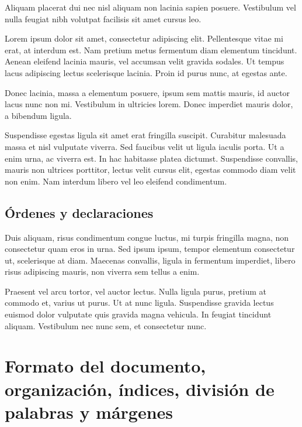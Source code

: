 \documentclass[12pt,a4paper]{report}
\begin{document}
Aliquam placerat dui nec nisl aliquam non lacinia sapien posuere. Vestibulum vel nulla feugiat nibh volutpat facilisis sit amet cursus leo.

Lorem ipsum dolor sit amet, consectetur adipiscing elit. Pellentesque vitae mi erat, at interdum est. Nam pretium metus fermentum diam elementum tincidunt. Aenean eleifend lacinia mauris, vel accumsan velit gravida sodales. Ut tempus lacus adipiscing lectus scelerisque lacinia. Proin id purus nunc, at egestas ante. 

Donec lacinia, massa a elementum posuere, ipsum sem mattis mauris, id auctor lacus nunc non mi. Vestibulum in ultricies lorem. Donec imperdiet mauris dolor, a bibendum ligula.

Suspendisse egestas ligula sit amet erat fringilla suscipit. Curabitur malesuada massa et nisl vulputate viverra. Sed faucibus velit ut ligula iaculis porta. Ut a enim urna, ac viverra est. In hac habitasse platea dictumst. Suspendisse convallis, mauris non ultrices porttitor, lectus velit cursus elit, egestas commodo diam velit non enim. Nam interdum libero vel leo eleifend condimentum. 





\section{Órdenes y declaraciones}
\label{seccion.ordenes}



Duis aliquam, risus condimentum congue luctus, mi turpis fringilla magna, non consectetur quam eros in urna. Sed ipsum ipsum, tempor elementum consectetur ut, scelerisque at diam. Maecenas convallis, ligula in fermentum imperdiet, libero risus adipiscing mauris, non viverra sem tellus a enim.

Praesent vel arcu tortor, vel auctor lectus. Nulla ligula purus, pretium at commodo et, varius ut purus. Ut at nunc ligula. Suspendisse gravida lectus euismod dolor vulputate quis gravida magna vehicula. In feugiat tincidunt aliquam. Vestibulum nec nunc sem, et consectetur nunc. 






\chapter[Formato, organización e índices]{Formato del documento, organización, índices, división de palabras y márgenes}\label{tema.formato}
\end{document}
